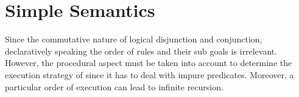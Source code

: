 \documentclass[thesis-solanki.tex]{subfiles}
\begin{document}

\section{Simple Semantics}

Since the commutative nature of logical disjunction and conjunction, declaratively speaking the order of rules and
their sub goals is irrelevant.
However, the procedural aspect must be taken into account to determine the execution strategy of 
since it has to deal with impure predicates.
Moreover, a particular order of execution can lead to infinite recursion.
\end{document}
